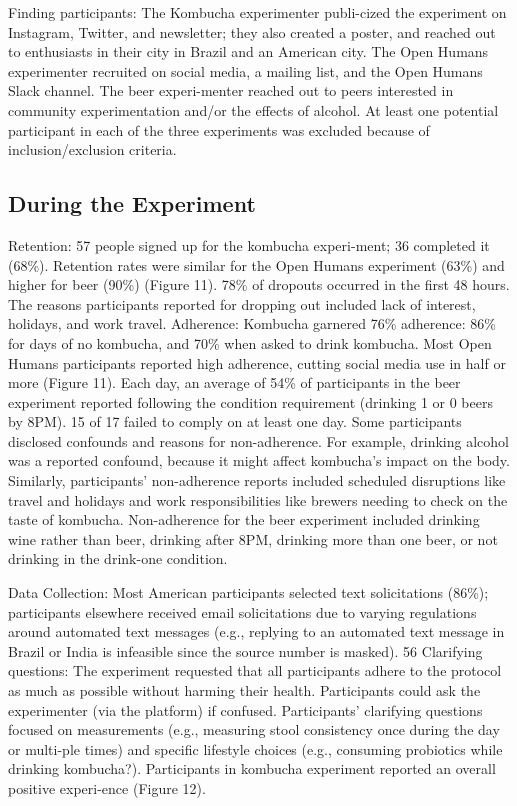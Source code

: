 Finding participants: The Kombucha experimenter publi-cized the experiment on Instagram, Twitter, and newsletter; they also created a poster, and reached out to enthusiasts in their city in Brazil and an American city. The Open Humans experimenter recruited on social media, a mailing list, and the Open Humans Slack channel. The beer experi-menter reached out to peers interested in community experimentation and/or the effects of alcohol. At least one potential participant in each of the three experiments was excluded because of inclusion/exclusion criteria. 

\subsection{During the Experiment}
Retention: 57 people signed up for the kombucha experi-ment; 36 completed it (68\%). Retention rates were similar for the Open Humans experiment (63\%) and higher for beer (90\%) (Figure 11). 78\% of dropouts occurred in the first 48 hours. The reasons participants reported for dropping out included lack of interest, holidays, and work travel.
Adherence: Kombucha garnered 76\% adherence: 86\% for days of no kombucha, and 70\% when asked to drink kombucha. Most Open Humans participants reported high adherence, cutting social media use in half or more (Figure 11). Each day, an average of 54\% of participants in the beer experiment reported following the condition requirement (drinking 1 or 0 beers by 8PM). 15 of 17 failed to comply on at least one day.
Some participants disclosed confounds and reasons for non-adherence. For example, drinking alcohol was a reported confound, because it might affect kombucha’s impact on the body. Similarly, participants’ non-adherence reports included scheduled disruptions like travel and holidays and work responsibilities like brewers needing to check on the taste of kombucha. Non-adherence for the beer experiment included drinking wine rather than beer, drinking after 8PM, drinking more than one beer, or not drinking in the drink-one condition.

Data Collection: Most American participants selected text solicitations (86\%); participants elsewhere received email solicitations due to varying regulations around automated text messages (e.g., replying to an automated text message in Brazil or India is infeasible since the source number is masked). 56%
Clarifying questions: The experiment requested that all participants adhere to the protocol as much as possible without harming their health. Participants could ask the experimenter (via the platform) if confused. Participants’ clarifying questions focused on measurements (e.g., measuring stool consistency once during the day or multi-ple times) and specific lifestyle choices (e.g., consuming probiotics while drinking kombucha?). Participants in kombucha experiment reported an overall positive experi-ence (Figure 12).

